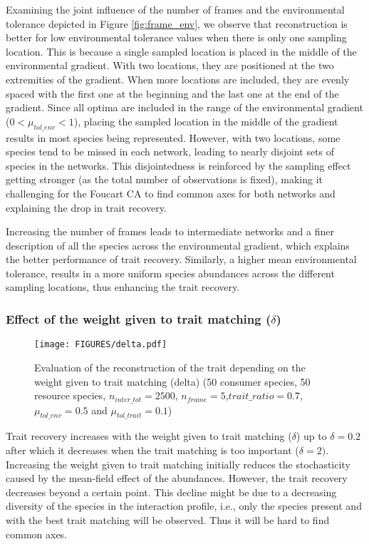 Examining the joint influence of the number of frames and the environmental tolerance depicted in Figure \ref{fig:frame_env}, we observe that reconstruction is better for low environmental tolerance values when there is only one sampling location. This is because a single sampled location is placed in the middle of the environmental gradient. With two locations, they are positioned at the two extremities of the gradient. When more locations are included, they are evenly spaced with the first one at the beginning and the last one at the end of the gradient. 
Since all optima are included in the range of the environmental gradient ($0 < \mu_{tol\_env} < 1$), placing the sampled location in the middle of the gradient results in most species being represented. However, with two locations, some species tend to be missed in each network, leading to nearly disjoint sets of species in the networks. This disjointedness is reinforced by the sampling effect getting stronger (as the total number of observations is fixed), making it challenging for the Foucart CA to find common axes for both networks and explaining the drop in trait recovery.

Increasing the number of frames leads to intermediate networks and a finer description of all the species across the environmental gradient, which explains the better performance of trait recovery. Similarly, a higher mean environmental tolerance, results in a more uniform species abundances across the different sampling locations, thus enhancing the trait recovery.


\subsubsection{Effect of the weight given to trait matching ($\delta$)}

\begin{figure}[H]
    \centering
    \texttt{[image: FIGURES/delta.pdf]}
    \caption{Evaluation of the reconstruction of the trait depending on the weight given to trait matching (delta) (50 consumer species, 50 resource species, $n_{inter\_tot} = 2500$, $n_{frame} = 5$,$trait\_ratio = 0.7$, $\mu_{tol\_env} = 0.5$ and $\mu_{tol\_trait} = 0.1$)}
    \label{fig:delta}
\end{figure}

Trait recovery increases with the weight given to trait matching ($\delta$) up to $\delta = 0.2$ after which it decreases when the trait matching is too important ($\delta = 2)$. Increasing the weight given to trait matching initially reduces the stochasticity caused by the mean-field effect of the abundances. However, the trait recovery decreases beyond a certain point. This decline might be due to a decreasing diversity of the species in the interaction profile, i.e., only the species present and with the best trait matching will be observed. Thus it will be hard to find common axes.



